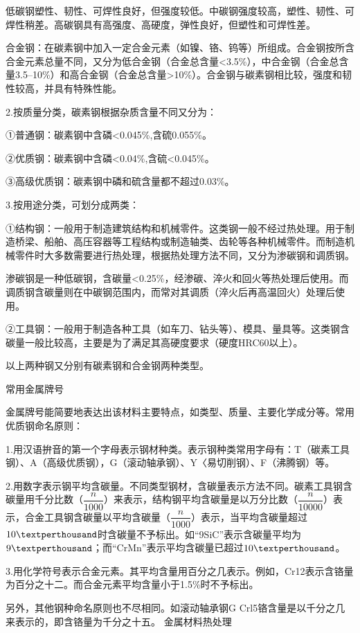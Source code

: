 \documentclass{ctexbook}
\begin{document}
低碳钢塑性、韧性、可焊性良好，但强度较低。中碳钢强度较高，塑性、韧性、可焊性稍差。高碳钢具有高强度、高硬度，弹性良好，但塑性和可焊性差。

合金钢：在碳素钢中加入一定合金元素（如镍、铬、钨等）所组成。合金钢按所含合金元素总量不同，又分为低合金钢（合金总含量<3.5\%），中合金钢（合金总含量3.5--10\%）和高合金钢（合金总含量>10\%）。合金钢与碳素钢相比较，强度和韧性较高，并具有特殊性能。

2.按质量分类，碳素钢根据杂质含量不同又分为：

①普通钢：碳素钢中含磷<0.045\%,含硫0.055\%。

②优质钢：碳素钢中含磷<0.04\%,含硫<0.045\%。

③高级优质钢：碳素钢中磷和硫含量都不超过0.03\%。

3.按用途分类，可划分成两类：

①结构钢：一般用于制造建筑结构和机械零件。这类钢一般不经过热处理。用于制造桥梁、船舶、高压容器等工程结构或制造轴类、齿轮等各种机械零件。而制造机械零件时大多数需要进行热处理，根据热处理方法不同，又分为渗碳钢和调质钢。

渗碳钢是一种低碳钢，含碳量<0.25\%，经渗碳、淬火和回火等热处理后使用。而调质钢含碳量则在中碳钢范围内，而常对其调质（淬火后再高温回火）处理后使用。

②工具钢：一般用于制造各种工具（如车刀、钻头等）、模具、量具等。这类钢含碳量一般比较高，主要是为了满足其高硬度要求（硬度HRC60以上）。

以上两种钢又分别有碳素钢和合金钢两种类型。

常用金属牌号

金属牌号能简要地表达出该材料主要特点，如类型、质量、主要化学成分等。常用优质钢命名原则：

1.用汉语拚音的第一个字母表示钢材种类。表示钢种类常用字母有：T（碳素工具钢）、A（高级优质钢），G（滚动轴承钢）、Y〈易切削钢）、F（沸腾钢）等。

2.用数字表示钢平均含碳量。不同类型钢材，含碳量表示方法不同。碳素工具钢含碳量用千分比数（$\dfrac{n}{1000}$）来表示，结构钢平均含碳量是以万分比数（$\dfrac{n}{10000}$）表示，合金工具钢含碳量以平均含碳量（$\dfrac{n}{1000}$）表示，当平均含碳量超过$10 \textperthousand $时含碳量不予标出。如“9SiC”表示含碳量平均为$ 9 \textperthousand $；而“CrMn”表示平均含碳量已超过$ 10 \textperthousand $。

3.用化学符号表示合金元素。其平均含量用百分之几表示。例如，Cr12表示含铬量为百分之十二。而合金元素平均含量小于1.5\%时不予标出。

另外，其他钢种命名原则也不尽相同。如滚动轴承钢G Crl5铬含量是以千分之几来表示的，即含铬量为千分之十五。
金属材料热处理
\end{document}
